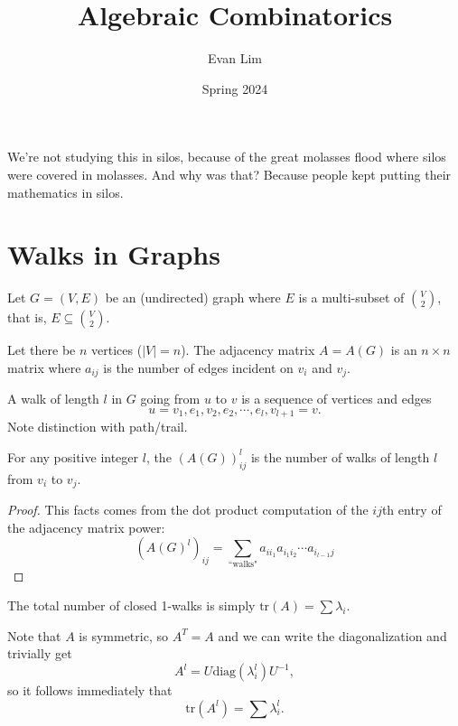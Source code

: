 \documentclass[11pt]{scrartcl}
\title{Algebraic Combinatorics}
\author{Evan Lim}
\date{Spring 2024}
\begin{document}
\maketitle
We're not studying this in silos, because of the great molasses flood where silos were covered in molasses. And why was that? Because people kept putting their mathematics in silos.
\section{Walks in Graphs}
Let $G=(V,E)$ be an (undirected) graph where $E$ is a multi-subset of $\binom{V}{2}$, that is, $E\subseteq\binom{V}{2}$.

Let there be $n$ vertices ($|V|=n$). The adjacency matrix $A=A(G)$ is an $n\times n$ matrix where $a_{ij}$ is the number of edges incident on $v_i$ and $v_j$.

A walk of length $l$ in $G$ going from $u$ to $v$ is a sequence of vertices and edges \[u=v_1,e_1,v_2,e_2,\cdots,e_{l},v_{l+1}=v.\] Note distinction with path/trail.

\begin{theorem}
    For any positive integer $l$, the $(A(G))^l_{ij}$ is the number of walks of length $l$ from $v_i$ to $v_j$.
\end{theorem}
\begin{proof}
    This facts comes from the dot product computation of the $ij$th entry of the adjacency matrix power: \[(A(G)^l)_{ij}=\sum_{\text{``walks"}} a_{ii_1}a_{i_1i_2}\cdots a_{i_{l-1}j}\]
\end{proof}
\begin{remark}
    The total number of closed 1-walks is simply $\text{tr}(A)=\sum\lambda_i$.
\end{remark}
Note that $A$ is symmetric, so $A^T=A$ and we can write the diagonalization and trivially get \[A^l=U\text{diag}(\lambda_i^l)U^{-1},\] so it follows immediately that \[\text{tr}(A^l)=\sum\lambda_i^l.\]
\end{document}
